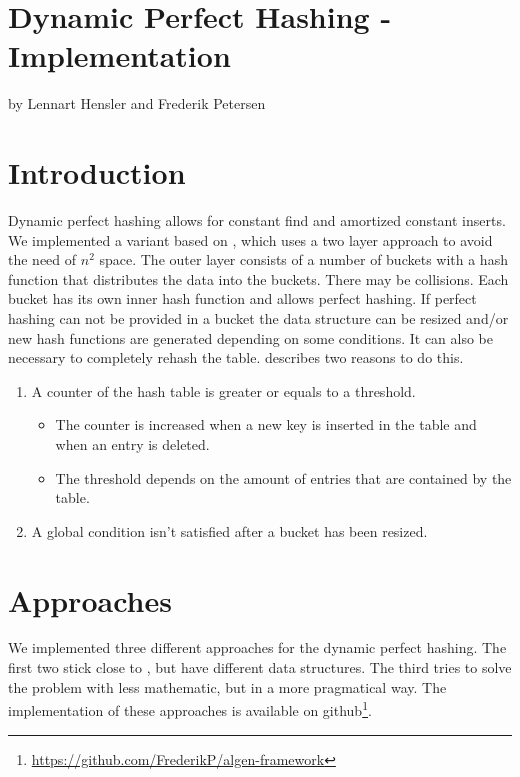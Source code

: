 \documentclass{article}
\begin{document}
\section*{Dynamic Perfect Hashing - Implementation}

by Lennart Hensler and Frederik Petersen

\section{Introduction}

Dynamic perfect hashing allows for constant find and amortized constant inserts.
We implemented a variant based on \cite{di94}, which uses a two layer approach
to avoid the need of $ n^2 $ space. The outer layer consists of a number of
buckets with a hash function that distributes the data into the buckets. There
may be collisions. Each bucket has its own inner hash function and allows
perfect hashing. If perfect hashing can not be provided in a bucket the data
structure can be resized and/or new hash functions are generated depending on
some conditions. It can also be necessary to completely rehash the table. \cite{di94} describes two reasons to do this.
\begin{enumerate}
  \item A counter of the hash table is greater or equals to a threshold.
  \begin{itemize}
    \item The counter is increased when a new key is inserted in the table and when an entry is deleted.
    \item The threshold depends on the amount of entries that are contained by the table.
  \end{itemize}
  \item A global condition isn't satisfied after a bucket has been resized.
\end{enumerate}

\section {Approaches}

We implemented three different approaches for the dynamic perfect hashing. The first two stick close to \cite{di94}, but have different data structures. The third tries to solve the problem with less mathematic, but in a more pragmatical way. The implementation of these approaches is available on github\footnote{\href{https://github.com/FrederikP/algen-framework}{https://github.com/FrederikP/algen-framework}}.
\end{document}
